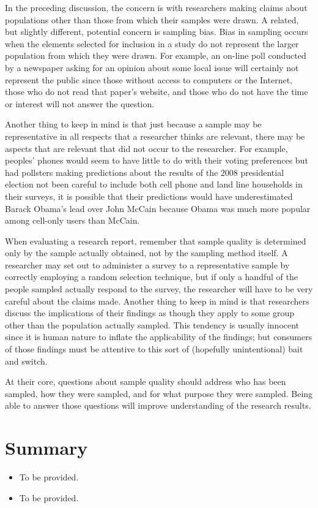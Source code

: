 In the preceding discussion, the concern is with researchers making claims about populations other than those from which their samples were drawn. A related, but slightly different, potential concern is sampling bias. Bias in sampling occurs when the elements selected for inclusion in a study do not represent the larger population from which they were drawn. For example, an on-line poll conducted by a newspaper asking for an opinion about some local issue will certainly not represent the public since those without access to computers or the Internet, those who do not read that paper's website, and those who do not have the time or interest will not answer the question.

Another thing to keep in mind is that just because a sample may be representative in all respects that a researcher thinks are relevant, there may be aspects that are relevant that did not occur to the researcher. For example, peoples' phones would seem to have little to do with their voting preferences but had pollsters making predictions about the results of the $ 2008 $ presidential election not been careful to include both cell phone and land line households in their surveys, it is possible that their predictions would have underestimated Barack Obama's lead over John McCain because Obama was much more popular among cell-only users than McCain\cite{keeter2008calling}.

When evaluating a research report, remember that sample quality is determined only by the sample actually obtained, not by the sampling method itself. A researcher may set out to administer a survey to a representative sample by correctly employing a random selection technique, but if only a handful of the people sampled actually respond to the survey, the researcher will have to be very careful about the claims made. Another thing to keep in mind is that researchers discuss the implications of their findings as though they apply to some group other than the population actually sampled. This tendency is usually innocent since it is human nature to inflate the applicability of the findings; but consumers of those findings must be attentive to this sort of (hopefully unintentional) bait and switch. 

At their core, questions about sample quality should address who has been sampled, how they were sampled, and for what purpose they were sampled. Being able to answer those questions will improve understanding of the research results.

\section{Summary}

\begin{itemize}
	\setlength{\itemsep}{0pt}
	\setlength{\parskip}{0pt}
	\setlength{\parsep}{0pt}
	
	\item To be provided.
	\item To be provided.
	
\end{itemize}
